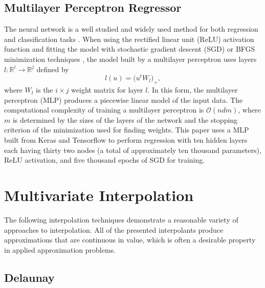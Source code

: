 \documentclass[smallextended,final]{svjour3}  %
\begin{document}
\subsection{Multilayer Perceptron Regressor}
\label{sec:mlp}
The neural network is a well studied and widely used method for both
regression and classification tasks
\cite{rumelhart1988learning,hornik1989multilayer}. When using the
rectified linear unit (ReLU) activation function
\cite{dahl2013improving} and fitting the model with stochastic
gradient descent (SGD) or BFGS minimization techniques
\cite{goh2017why,moller1993scaled,robbins1951stochastic}, the model
built by a multilayer perceptron uses layers $l : \mathbb{R}^{i}
\rightarrow \mathbb{R}^{j}$ defined by
 $$ l(u) = \bigl( u^t W_l \bigr)_+ ,$$
where $W_l$ is the $i \times j$ weight matrix for layer $l$. In this
form, the multilayer perceptron (MLP) produces a piecewise linear
model of the input data. The computational complexity of training a
multilayer perceptron is $\mathcal{O}(n d m)$, where $m$ is determined
by the sizes of the layers of the network and the stopping criterion
of the minimization used for finding weights. This paper uses a MLP
built from Keras and Tensorflow to perform regression
\cite{chollet2015keras,tensorflow2015-whitepaper} with ten hidden
layers each having thirty two nodes (a total of approximately ten
thousand parameters), ReLU activation, and five thousand epochs of SGD
for training.

\section{Multivariate Interpolation}
\label{sec:interpolation}
The following interpolation techniques demonstrate a reasonable
variety of approaches to interpolation. All of the presented
interpolants produce approximations that are continuous in value,
which is often a desirable property in applied approximation problems.

\subsection{Delaunay}
\label{sec:delaunay}
\end{document}
